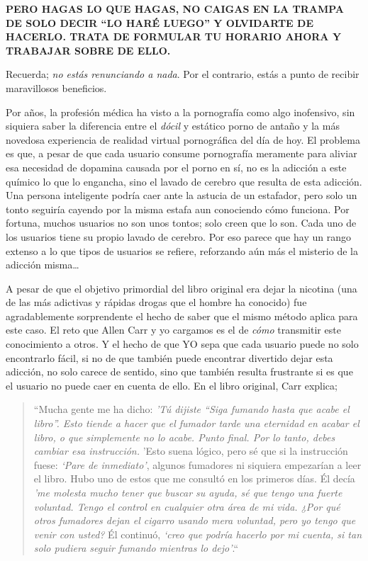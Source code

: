 \documentclass[
  openany]{book}
\begin{document}
\textbf{PERO HAGAS LO QUE HAGAS, NO CAIGAS EN LA TRAMPA DE SOLO DECIR ``LO HARÉ LUEGO'' Y OLVIDARTE DE HACERLO. TRATA DE FORMULAR TU HORARIO {AHORA} Y TRABAJAR SOBRE DE ELLO.}

Recuerda; \emph{no estás renunciando a nada}. Por el contrario, estás a punto de recibir maravillosos beneficios.

Por años, la profesión médica ha visto a la pornografía como algo inofensivo, sin siquiera saber la diferencia entre el \emph{dócil} y estático porno de antaño y la más novedosa experiencia de realidad virtual pornográfica del día de hoy. El problema es que, a pesar de que cada usuario consume pornografía meramente para aliviar esa necesidad de dopamina causada por el porno en sí, no es la adicción a este químico lo que lo engancha, sino el lavado de cerebro que resulta de esta adicción. Una persona inteligente podría caer ante la astucia de un estafador, pero solo un tonto seguiría cayendo por la misma estafa aun conociendo cómo funciona. Por fortuna, muchos usuarios no son unos tontos; solo creen que lo son. Cada uno de los usuarios tiene su propio lavado de cerebro. Por eso parece que hay un rango extenso a lo que tipos de usuarios se refiere, reforzando aún más el misterio de la adicción misma\ldots{}

A pesar de que el objetivo primordial del libro original era dejar la nicotina (una de las más adictivas y rápidas drogas que el hombre ha conocido) fue agradablemente sorprendente el hecho de saber que el mismo método aplica para este caso. El reto que Allen Carr y yo cargamos es el de \emph{cómo} transmitir este conocimiento a otros. Y el hecho de que YO sepa que cada usuario puede no solo encontrarlo fácil, si no de que también puede encontrar divertido dejar esta adicción, no solo carece de sentido, sino que también resulta frustrante si es que el usuario no puede caer en cuenta de ello. En el libro original, Carr explica;

\begin{quote}
``Mucha gente me ha dicho: \emph{'Tú dijiste ``Siga fumando hasta que acabe el libro''. Esto tiende a hacer que el fumador tarde una eternidad en acabar el libro, o que simplemente no lo acabe. Punto final. Por lo tanto, debes cambiar esa instrucción.} 'Esto suena lógico, pero sé que si la instrucción fuese: \emph{`Pare de inmediato'}, algunos fumadores ni siquiera empezarían a leer el libro. Hubo uno de estos que me consultó en los primeros días. Él decía \emph{'me molesta mucho tener que buscar su ayuda, sé que tengo una fuerte voluntad. Tengo el control en cualquier otra área de mi vida. ¿Por qué otros fumadores dejan el cigarro usando mera voluntad, pero yo tengo que venir con usted?} Él continuó, \emph{`creo que podría hacerlo por mi cuenta, si tan solo pudiera seguir fumando mientras lo dejo'}.``
\end{quote}
\end{document}
